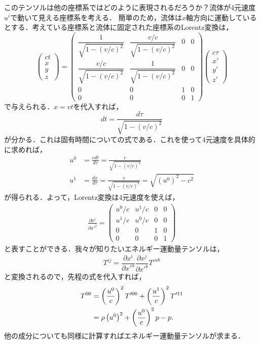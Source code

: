 \documentclass[a4paper]{ltjsreport}
\begin{document}
このテンソルは他の座標系ではどのように表現されるだろうか？流体が4元速度$u^i$で動いて見える座標系を考える．
簡単のため，流体は$x$軸方向に運動しているとする．考えている座標系と流体に固定された座標系のLorentz変換は，
\[
\begin{pmatrix}
  ct\\
  x\\
  y\\
  z
\end{pmatrix}
=
\begin{pmatrix}
  \dfrac{1}{\sqrt{1 - (v/c)^2}} & \dfrac{v/c}{\sqrt{1 - (v/c)^2}} & 0 & 0\\
  \dfrac{v/c}{\sqrt{1 - (v/c)^2}} & \dfrac{1}{\sqrt{1 - (v/c)^2}} & 0 & 0\\
  0 & 0 & 1 & 0\\
  0 & 0 & 0 & 1
\end{pmatrix}
\begin{pmatrix}
  c\tau\\
  x'\\
  y'\\
  z'
\end{pmatrix}
\]
で与えられる．$x=vt$を代入すれば，
\[dt=\frac{d\tau}{\sqrt{1 - (v/c)^2}}\]
が分かる．これは固有時間についての式である．これを使って4元速度を具体的に求めれば，
\begin{align}
  u^0 &= \frac{cdt}{d\tau} = \frac{c}{\sqrt{1 - (v/c)^2}}\\
  u^1 &= \frac{dx}{d\tau} = \frac{v}{\sqrt{1 - (v/c)^2}} = \sqrt{\left(u^0\right)^2 - c^2}
\end{align}
が得られる．よって，Lorentz変換は4元速度を使えば，
\begin{align}
  \frac{\partial{x^i}}{\partial{x'^j}}=
  \begin{pmatrix}
    {u^0}/{c} & {u^1}/{c} & 0 & 0\\
    {u^1}/{c} & {u^0}/{c} & 0 & 0\\
    0 & 0 & 1 & 0\\
    0 & 0 & 0 & 1
  \end{pmatrix}
\end{align}
と表すことができる．我々が知りたいエネルギー運動量テンソルは，
\[T^{ij}=\frac{\partial{x^i}}{\partial{x'^a}}\frac{\partial{x^j}}{\partial{x'^b}}T'^{ab}\]
と変換されるので，先程の式を代入すれば，
\begin{align}
  T^{00} &= \left(\frac{u^0}{c}\right)^2 T'^{00} + \left(\frac{u^1}{c}\right)^2 T'^{11}\notag\\
  &= \rho\left(u^0\right)^2 + \left(\frac{u^0}{c}\right)^2p - p .
\end{align}
他の成分についても同様に計算すればエネルギー運動量テンソルが求まる．
\end{document}
